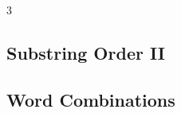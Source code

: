 \documentclass[8pt]{extarticle}
\begin{document}
\begin{multicols*}{3}
\subsection{Substring Order II}
\begin{caixaenunciado}

\end{caixaenunciado}
\vspace{0.3cm}


\subsection{Word Combinations}
\begin{caixaenunciado}

\end{caixaenunciado}
\vspace{0.3cm}

\end{multicols*}
\pagebreak
\end{document}
